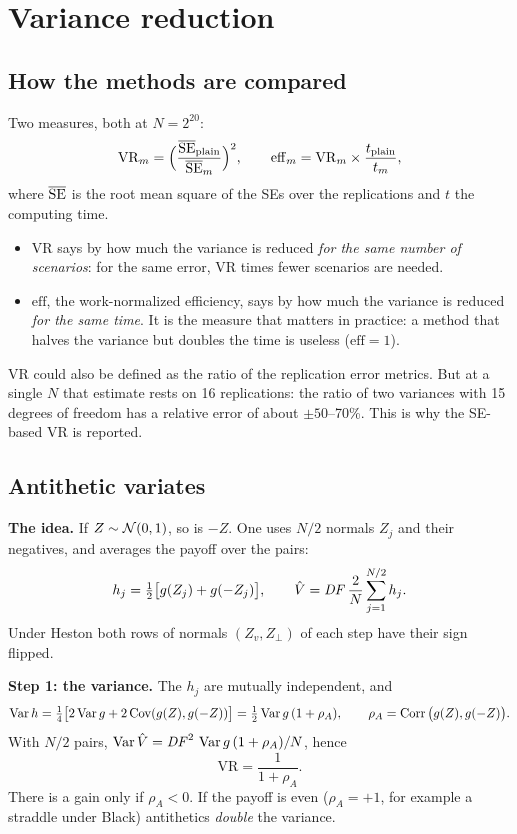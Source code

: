 \section{Variance reduction}
\label{sec:bm-vr}
\subsection{How the methods are compared}
Two measures, both at $N=2^{20}$:
\begin{equation}\label{eq:bm-vr-eff}
\mathrm{VR}_m=\Big(\frac{\overline{\mathrm{SE}}_{\text{plain}}}{\overline{\mathrm{SE}}_m}\Big)^2,
\qquad
\mathrm{eff}_m=\mathrm{VR}_m\times\frac{t_{\text{plain}}}{t_m},
\end{equation}
where $\overline{\mathrm{SE}}$ is the root mean square of the SEs over the replications and $t$ the computing time.
\begin{itemize}
\item $\mathrm{VR}$ says by how much the variance is reduced \emph{for the same number of scenarios}: for the same
error, $\mathrm{VR}$ times fewer scenarios are needed.
\item $\mathrm{eff}$, the work-normalized efficiency, says by how much the variance is reduced \emph{for the same time}. It is the measure that matters
in practice: a method that halves the variance but doubles the time is useless ($\mathrm{eff}=1$).
\end{itemize}
VR could also be defined as the ratio of the replication error metrics. But at a single $N$ that estimate rests on 16
replications: the ratio of two variances with 15 degrees of freedom has a relative error of about $\pm50$--70\%. This
is why the SE-based VR is reported.

\subsection{Antithetic variates}
\textbf{The idea.} If $Z\sim\mathcal{N}(0,1)$, so is $-Z$. One uses $N/2$ normals $Z_j$ and their negatives, and averages the
payoff over the pairs:
\[
h_j=\tfrac12\big[g(Z_j)+g(-Z_j)\big],\qquad\hat V=\mathit{DF}\,\frac2N\sum_{j=1}^{N/2}h_j .
\]
Under Heston both rows of normals $(Z_v,Z_\perp)$ of each step have their sign flipped.

\textbf{Step 1: the variance.} The $h_j$ are mutually independent, and
\[
\operatorname{Var} h=\tfrac14\big[2\operatorname{Var} g+2\operatorname{Cov}(g(Z),g(-Z))\big]=\tfrac12\operatorname{Var} g\,(1+\rho_A),
\qquad\rho_A=\operatorname{Corr}\big(g(Z),g(-Z)\big).
\]
With $N/2$ pairs, $\operatorname{Var}\hat V=\mathit{DF}^2\,\operatorname{Var} g\,(1+\rho_A)/N$, hence
\[
\mathrm{VR}=\frac1{1+\rho_A}.
\]
There is a gain only if $\rho_A<0$. If the payoff is even ($\rho_A=+1$, for example a straddle under Black)
antithetics \emph{double} the variance.

